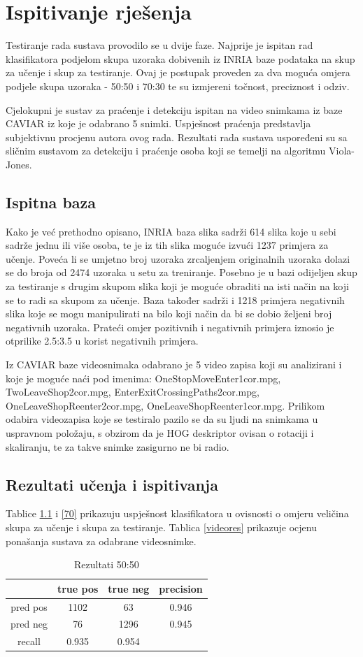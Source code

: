 \documentclass[utf8, seminar, numeric, times]{fer}
\begin{document}
\chapter{Ispitivanje rješenja}
Testiranje rada sustava provodilo se u dvije faze. Najprije je ispitan rad klasifikatora podjelom skupa uzoraka dobivenih iz INRIA baze podataka na skup za učenje i skup za testiranje. Ovaj je postupak proveden za dva moguća omjera podjele skupa uzoraka - 50:50 i  70:30 te su izmjereni točnost, preciznost i odziv.

Cjelokupni je sustav za praćenje i detekciju ispitan na video snimkama iz baze CAVIAR iz koje je odabrano 5 snimki. Uspješnost praćenja predstavlja subjektivnu procjenu autora ovog rada. Rezultati rada sustava uspoređeni su sa sličnim sustavom za detekciju i praćenje osoba koji se temelji na algoritmu Viola-Jones.
\section{Ispitna baza}
Kako je već prethodno opisano, INRIA baza slika sadrži 614 slika koje u sebi sadrže jednu ili više osoba, te je iz tih slika moguće izvući  1237 primjera za učenje. Poveća li se umjetno broj uzoraka zrcaljenjem originalnih uzoraka dolazi se do broja od 2474 uzoraka u setu za treniranje. Posebno je u bazi odijeljen skup za testiranje s drugim skupom slika koji je moguće obraditi na isti način na koji se to radi sa skupom za učenje. Baza također sadrži  i 1218 primjera negativnih slika koje se mogu manipulirati na bilo koji način da bi se dobio željeni broj negativnih uzoraka. Prateći \cite{hog} omjer pozitivnih i negativnih primjera iznosio je otprilike 2.5:3.5 u korist negativnih primjera.    

Iz CAVIAR baze videosnimaka odabrano je 5 video zapisa koji su analizirani i koje je moguće naći pod imenima: OneStopMoveEnter1cor.mpg, TwoLeaveShop2cor.mpg, EnterExitCrossingPaths2cor.mpg, OneLeaveShopReenter2cor.mpg, OneLeaveShopReenter1cor.mpg. Prilikom odabira videozapisa koje se testiralo pazilo se da su ljudi na snimkama u uspravnom položaju, s obzirom da je HOG deskriptor ovisan o rotaciji i skaliranju, te za takve snimke zasigurno ne bi radio.
\section{Rezultati učenja i ispitivanja}
Tablice \ref{50} i \ref{70} prikazuju uspješnost klasifikatora u ovisnosti o omjeru veličina skupa za učenje i skupa za testiranje. Tablica \ref{videores} prikazuje ocjenu ponašanja sustava za odabrane videosnimke.
\begin{table}
\begin{center}
\begin{tabular}{|c|c|c|c|}
\hline
 & true pos & true neg& precision\\ \hline
pred pos & 1102 & 63 &0.946\\ \hline
pred neg & 76 & 1296 &0.945\\ \hline
recall &0.935 & 0.954& \\ \hline
\end{tabular}
\end{center}
\caption{Rezultati 50:50}
\label{50}
\end{table}
\end{document}
